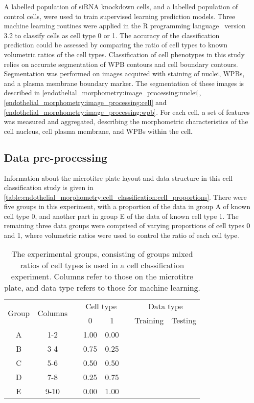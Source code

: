 A labelled population of siRNA knockdown cells, and a labelled population of control cells, were used to train supervised learning prediction models. Three machine learning routines were applied in the R programming language~\cite{RCoreTeam2014} version 3.2 to classify cells as cell type 0 or 1. The accuracy of the classification prediction could be assessed by comparing the ratio of cell types to known volumetric ratios of the cell types. Classification of cell phenotypes in this study relies on accurate segmentation of WPB contours and cell boundary contours. Segmentation was performed on images acquired with staining of nuclei, WPBs, and a plasma membrane boundary marker. The segmentation of these images is described in \autoref{endothelial_morphometry:image_processing:nuclei}, \autoref{endothelial_morphometry:image_processing:cell} and \autoref{endothelial_morphometry:image_processing:wpb}. For each cell, a set of features was measured and aggregated, describing the morphometric characteristics of the cell nucleus, cell plasma membrane, and WPBs within the cell.

\subsection{Data pre-processing}
\label{endothelial_morphometry:cell_classification:data_pre-processing}
Information about the microtitre plate layout and data structure in this cell classification study is given in \autoref{table:endothelial_morphometry:cell_classification:cell_proportions}. There were five groups in this experiment, with a proportion of the data in group A of known cell type 0, and another part in group E of the data of known cell type 1. The remaining three data groups were comprised of varying proportions of cell types 0 and 1, where volumetric ratios were used to control the ratio of each cell type.

\begin{table}[htbp!]
\centering
\caption[Cell classification mixed ratio groups]{The experimental groups, consisting of groups mixed ratios of cell types is used in a cell classification experiment. Columns refer to those on the microtitre plate, and data type refers to those for machine learning.}
\label{table:endothelial_morphometry:cell_classification:cell_proportions}
\begin{tabular}{c c c c c c c c}
\toprule
\multirow{2}{*}{Group} & \multirow{2}{*}{Columns} & & \multicolumn{2}{c}{Cell type} & & \multicolumn{2}{c}{Data type} \\
\cmidrule{4-5}
\cmidrule{7-8}
	& & & 0 & 1 & & Training & Testing \\
\midrule
	A & 1-2  & & 1.00 & 0.00 & & \cmark & \cmark \\
	B & 3-4  & & 0.75 & 0.25 & & \xmark & \cmark \\
	C & 5-6  & & 0.50 & 0.50 & & \xmark & \cmark \\
	D & 7-8  & & 0.25 & 0.75 & & \xmark & \cmark \\
	E & 9-10 & & 0.00 & 1.00 & & \cmark & \cmark \\
\bottomrule
\end{tabular}
\end{table}

